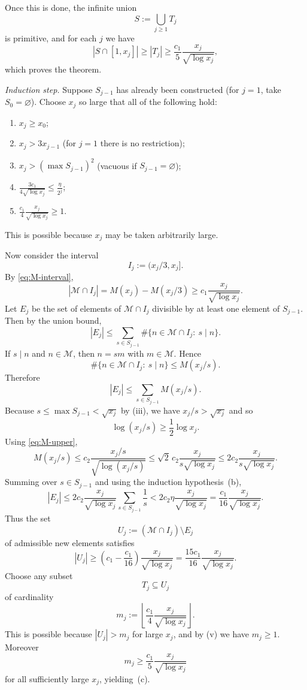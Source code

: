 Once this is done, the infinite union
\[
S:=\bigcup_{j\ge 1}T_j
\]
is primitive, and for each $j$ we have
\[
|S\cap[1,x_j]|\ge |T_j|\ge \frac{c_1}{5}\frac{x_j}{\sqrt{\log x_j}},
\]
which proves the theorem.

\medskip

\emph{Induction step.}
Suppose $S_{j-1}$ has already been constructed (for $j=1$, take $S_0=\varnothing$).
Choose $x_j$ so large that all of the following hold:
\begin{enumerate}
\item[(i)] $x_j\ge x_0$;
\item[(ii)] $x_j>3x_{j-1}$ (for $j=1$ there is no restriction);
\item[(iii)] $x_j>(\max S_{j-1})^2$ (vacuous if $S_{j-1}=\varnothing$);
\item[(iv)] $\displaystyle \frac{3c_1}{4\sqrt{\log x_j}}\le \frac{\eta}{2^j}$;
\item[(v)] $\displaystyle \frac{c_1}{4}\frac{x_j}{\sqrt{\log x_j}}\ge 1$.
\end{enumerate}
This is possible because $x_j$ may be taken arbitrarily large.

Now consider the interval
\[
I_j:=(x_j/3,x_j].
\]
By \eqref{eq:M-interval},
\[
|\mathcal M\cap I_j|
=
M(x_j)-M(x_j/3)
\ge c_1\frac{x_j}{\sqrt{\log x_j}}.
\]
Let $E_j$ be the set of elements of $\mathcal M\cap I_j$ divisible by at least one element of $S_{j-1}$.
Then by the union bound,
\[
|E_j|
\le \sum_{s\in S_{j-1}}\#\{n\in\mathcal M\cap I_j:\ s\mid n\}.
\]
If $s\mid n$ and $n\in \mathcal M$, then $n=sm$ with $m\in\mathcal M$.
Hence
\[
\#\{n\in\mathcal M\cap I_j:\ s\mid n\}\le M(x_j/s).
\]
Therefore
\[
|E_j|
\le \sum_{s\in S_{j-1}} M(x_j/s).
\]
Because $s\le \max S_{j-1}<\sqrt{x_j}$ by (iii), we have $x_j/s>\sqrt{x_j}$ and so
\[
\log(x_j/s)\ge \frac12\log x_j.
\]
Using \eqref{eq:M-upper},
\[
M(x_j/s)\le c_2\frac{x_j/s}{\sqrt{\log(x_j/s)}}
\le \sqrt 2\,c_2\frac{x_j}{s\sqrt{\log x_j}}
\le 2c_2\frac{x_j}{s\sqrt{\log x_j}}.
\]
Summing over $s\in S_{j-1}$ and using the induction hypothesis~(b),
\[
|E_j|
\le 2c_2\frac{x_j}{\sqrt{\log x_j}}\sum_{s\in S_{j-1}}\frac1s
< 2c_2\eta\frac{x_j}{\sqrt{\log x_j}}
=
\frac{c_1}{16}\frac{x_j}{\sqrt{\log x_j}}.
\]
Thus the set
\[
U_j:=(\mathcal M\cap I_j)\setminus E_j
\]
of admissible new elements satisfies
\[
|U_j|
\ge \left(c_1-\frac{c_1}{16}\right)\frac{x_j}{\sqrt{\log x_j}}
=
\frac{15c_1}{16}\frac{x_j}{\sqrt{\log x_j}}.
\]
Choose any subset
\[
T_j\subseteq U_j
\]
of cardinality
\[
m_j:=\left\lfloor \frac{c_1}{4}\frac{x_j}{\sqrt{\log x_j}}\right\rfloor.
\]
This is possible because $|U_j|>m_j$ for large $x_j$, and by (v) we have $m_j\ge 1$.
Moreover
\[
m_j\ge \frac{c_1}{5}\frac{x_j}{\sqrt{\log x_j}}
\]
for all sufficiently large $x_j$, yielding~(c).

